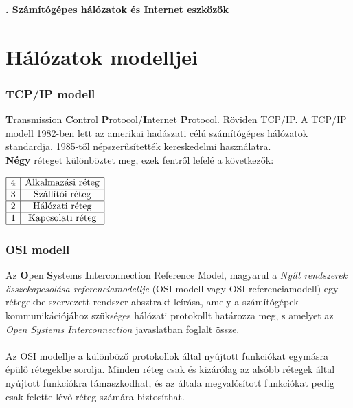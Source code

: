 \documentclass[12pt]{article}
\begin{document}
    \thispagestyle{fancy}

    {\Large\bfseries{}. Számítógépes hálózatok és Internet eszközök} \\

	\section*{Hálózatok modelljei}

	\subsubsection*{TCP/IP modell\\}

	\textbf{T}ransmission \textbf{C}ontrol \textbf{P}rotocol/\textbf{I}nternet \textbf{P}rotocol. Röviden TCP/IP. A TCP/IP modell 1982-ben lett az amerikai hadászati célú számítógépes hálózatok standardja. 1985-től népszerűsítették kereskedelmi használatra.\\
				
	\noindent \textbf{Négy} réteget különböztet meg, ezek fentről lefelé a következők:\\
    \begin{center}
        \renewcommand{\arraystretch}{2}
        $\begin{array}{|l|c|}
            \hline
            4 & \text{Alkalmazási réteg} \\ \hline
            3 & \text{Szállítói réteg} \\  \hline
            2 & \text{Hálózati réteg} \\  \hline
            1 & \text{Kapcsolati réteg}\\  \hline
        \end{array}$
        \renewcommand{\arraystretch}{1}
    \end{center}
	
    \subsubsection*{OSI modell}

    Az \textbf{O}pen \textbf{S}ystems \textbf{I}nterconnection Reference Model, magyarul a \emph{Nyílt rendszerek összekapcsolása referenciamodellje} (OSI-modell vagy OSI-referenciamodell) egy rétegekbe szervezett rendszer absztrakt leírása, amely a számítógépek kommunikációjához szükséges hálózati protokollt határozza meg, s amelyet az \emph{Open Systems Interconnection} javaslatban foglalt össze.\\\\
    Az OSI modellje a különböző protokollok által nyújtott funkciókat egymásra épülő rétegekbe sorolja. Minden réteg csak és kizárólag az alsóbb rétegek által nyújtott funkciókra támaszkodhat, és az általa megvalósított funkciókat pedig csak felette lévő réteg számára biztosíthat.\\
	
\end{document}
